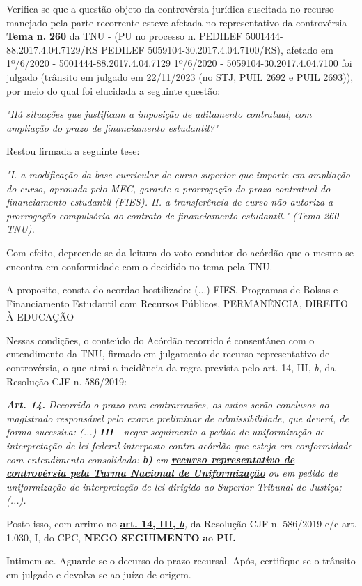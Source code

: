 \documentclass[12pt]{article}
\begin{document}
\justifying
\noindent Verifica-se que a questão objeto da controvérsia jurídica suscitada no recurso manejado pela parte recorrente esteve afetada no representativo da controvérsia - \textbf{Tema n. }\textbf{260} da TNU - (PU no processo n. PEDILEF 5001444-88.2017.4.04.7129/RS PEDILEF 5059104-30.2017.4.04.7100/RS),  afetado em 1º/6/2020 - 5001444-88.2017.4.04.7129 1º/6/2020 - 5059104-30.2017.4.04.7100 foi julgado (trânsito em julgado em 22/11/2023 (no STJ, PUIL 2692 e PUIL 2693)), por meio do qual foi elucidada a seguinte questão:

\noindent \textit{"Há situações que justificam a imposição de aditamento contratual, com ampliação do prazo de financiamento estudantil?"}

\noindent Restou firmada a seguinte tese:

\noindent \textit{"I. a modificação da base curricular de curso superior que importe em ampliação do curso, aprovada pelo MEC, garante a prorrogação do prazo contratual do financiamento estudantil (FIES). II. a transferência de curso não autoriza a prorrogação compulsória do contrato de financiamento estudantil." (Tema 260 TNU).}

\noindent Com efeito, depreende-se da leitura do voto condutor do acórdão que o mesmo se encontra em conformidade com o decidido no  tema pela TNU.

\noindent A proposito, consta do acordao hostilizado: (...) FIES, Programas de Bolsas e Financiamento Estudantil com Recursos Públicos, PERMANÊNCIA, DIREITO À EDUCAÇÃO

\noindent Nessas condições, o conteúdo do Acórdão recorrido é consentâneo com o entendimento da TNU, firmado em julgamento de recurso representativo de controvérsia, o que atrai a incidência da regra prevista pelo art. 14, III, \textit{b,} da Resolução CJF n. 586/2019:

\noindent \textit{\textbf{Art. 14.}}\textit{ Decorrido o prazo para contrarrazões, os autos serão conclusos ao magistrado responsável pelo exame preliminar de admissibilidade, que deverá, de forma sucessiva: (...) }\textit{\textbf{III }}\textit{- negar seguimento a pedido de uniformização de interpretação de lei federal interposto contra acórdão que esteja em conformidade com entendimento consolidado: }\textit{\textbf{b)}}\textit{ em }\uline{\textit{\textbf{recurso representativo de controvérsia pela Turma Nacional de Uniformização}}}\textit{ ou em pedido de uniformização de interpretação de lei dirigido ao Superior Tribunal de Justiça;(...).}

\noindent Posto isso, com arrimo no \uline{\textbf{art. 14, III, }}\uline{\textit{\textbf{b}}}\textit{,} da Resolução CJF n. 586/2019 c/c art. 1.030, I, do CPC, \textbf{NEGO SEGUIMENTO }\textbf{a}o\textbf{ PU}\textbf{.}

\noindent Intimem-se. Aguarde-se o decurso do prazo recursal. Após, certifique-se o trânsito em julgado e devolva-se ao juízo de origem.
\end{document}
